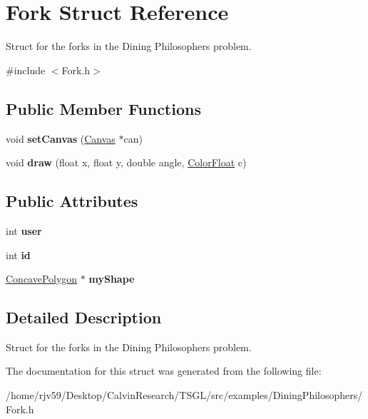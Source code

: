\hypertarget{struct_fork}{}\section{Fork Struct Reference}
\label{struct_fork}


Struct for the forks in the Dining Philosophers\textquotesingle{} problem.  




{\ttfamily \#include $<$Fork.\+h$>$}

\subsection*{Public Member Functions}
\begin{DoxyCompactItemize}
\item 
\mbox{\label{struct_fork_a17aae2a4e6464c2ec8ac439443b7433e}} 
void {\bfseries set\+Canvas} (\hyperlink{classtsgl_1_1_canvas}{Canvas} $\ast$can)
\item 
\mbox{\label{struct_fork_a037d640832899cd5cad90b2c2ea4f4ec}} 
void {\bfseries draw} (float x, float y, double angle, \hyperlink{structtsgl_1_1_color_float}{Color\+Float} c)
\end{DoxyCompactItemize}
\subsection*{Public Attributes}
\begin{DoxyCompactItemize}
\item 
\mbox{\label{struct_fork_a28995f27196a2b80cf48024fd728d7df}} 
int {\bfseries user}
\item 
\mbox{\label{struct_fork_a72d6934869569aea1806a74e544b05f3}} 
int {\bfseries id}
\item 
\mbox{\label{struct_fork_aa1cd6cedb40e543d1ae4e7c8d9db24d7}} 
\hyperlink{classtsgl_1_1_concave_polygon}{Concave\+Polygon} $\ast$ {\bfseries my\+Shape}
\end{DoxyCompactItemize}


\subsection{Detailed Description}
Struct for the forks in the Dining Philosophers\textquotesingle{} problem. 

The documentation for this struct was generated from the following file\+:\begin{DoxyCompactItemize}
\item 
/home/rjv59/\+Desktop/\+Calvin\+Research/\+T\+S\+G\+L/src/examples/\+Dining\+Philosophers/Fork.\+h\end{DoxyCompactItemize}
